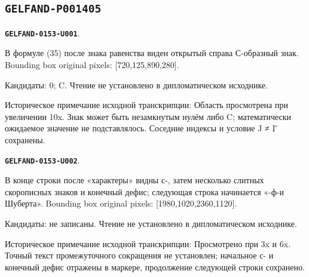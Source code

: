 \documentclass[11pt]{article}
\theoremstyle{definition}
\theoremstyle{remark}
\begin{document}
\subsection*{\texttt{GELFAND-P001405}}
\par\noindent\leavevmode{}\label{GELFAND-0153-U001}\label{GELFAND-P001405:pairing-value:note}\textbf{\texttt{GELFAND-0153-U001}}.\nopagebreak[4]\par
В формуле (35) после знака равенства виден открытый справа С-образный знак. Bounding box original pixels: [720,125,890,280].\par
Кандидаты: 0; C. Чтение не установлено в дипломатическом исходнике.\par
Историческое примечание исходной транскрипции: Область просмотрена при увеличении 10x. Знак может быть незамкнутым нулём либо C; математически ожидаемое значение не подставлялось. Соседние индексы и условие J ≠ I′ сохранены.\par\medskip
\par\noindent\leavevmode{}\label{GELFAND-0153-U002}\label{GELFAND-P001405:characters-line-ending:note}\textbf{\texttt{GELFAND-0153-U002}}.\nopagebreak[4]\par
В конце строки после «характеры» видны с-, затем несколько слитных скорописных знаков и конечный дефис; следующая строка начинается «-ф-и Шуберта». Bounding box original pixels: [1980,1020,2360,1120].\par
Кандидаты: не записаны. Чтение не установлено в дипломатическом исходнике.\par
Историческое примечание исходной транскрипции: Просмотрено при 3x и 6x. Точный текст промежуточного сокращения не установлен; начальное с- и конечный дефис отражены в маркере, продолжение следующей строки сохранено.\par\medskip
\end{document}

